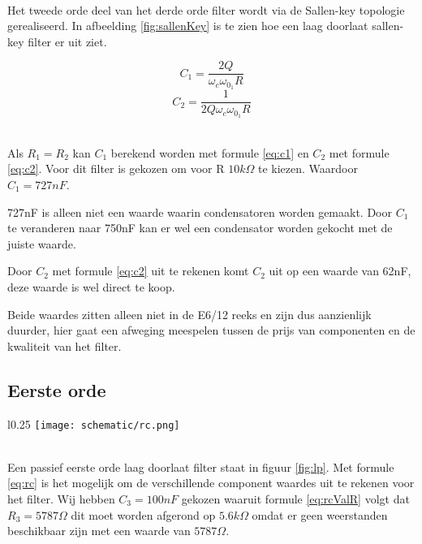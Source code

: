 \vphantom{-}\\
\begin{minipage}{0.37\textwidth}
	Het tweede orde deel van het derde orde filter wordt via de Sallen-key topologie gerealiseerd. In afbeelding \ref{fig:sallenKey} is te zien 
	hoe een laag doorlaat sallen-key filter er uit ziet.
\end{minipage}
\hfill
\begin{minipage}{0.37\textwidth}
	\begin{equation} \label{eq:c1}
		C_1=\frac{2Q}{\omega_c\omega_{0_1}R}
	\end{equation}
	\begin{equation} \label{eq:c2}
		C_2=\frac{1}{2Q\omega_c\omega_{0_1}R}
	\end{equation}
\end{minipage}
\vphantom{-}\\

\noindent
Als $R_1 = R_2$ kan $C_1$ berekend worden met formule \ref{eq:c1} en $C_2$ met formule \ref{eq:c2}.
Voor dit filter is gekozen om voor R $10k\Omega$ te kiezen. Waardoor $C_1=727nF$.

\noindent
727nF is alleen niet een waarde waarin condensatoren worden gemaakt. Door $C_1$ te veranderen naar 750nF 
kan er wel een condensator worden gekocht met de juiste waarde. 

\noindent
Door $C_2$ met formule \ref{eq:c2} uit te rekenen komt $C_2$ uit op een waarde van 62nF, deze waarde is wel direct 
te koop. 

\noindent
Beide waardes zitten alleen niet in de E6/12 reeks en zijn dus aanzienlijk duurder, 
hier gaat een afweging meespelen tussen de prijs van componenten en de kwaliteit van het filter.

\subsection{Eerste orde}
\begin{wrapfigure}[5]{l}{0.25\textwidth}
	\texttt{[image: schematic/rc.png]}
	\caption{Eerste orde lp filter}
	\label{fig:lp}
\end{wrapfigure}
\vphantom{-}\\
Een passief eerste orde laag doorlaat filter staat in figuur \ref{fig:lp}. Met formule \ref{eq:rc} is het mogelijk om de verschillende component waardes uit te rekenen 
voor het filter. Wij hebben $C_3=100nF$ gekozen waaruit formule \ref{eq:rcValR} volgt dat 
$R_3=5787\Omega$ dit moet worden afgerond op $5.6k\Omega$ omdat er geen weerstanden beschikbaar zijn met een waarde van $5787\Omega$.

